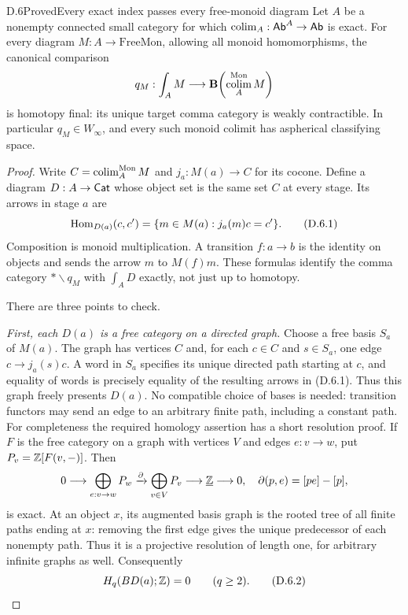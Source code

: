 \begin{claim}{D.6}{Proved}{Every exact index passes every free-monoid diagram}
\label{D:exact-monoids}
Let $A$ be a nonempty connected small category for which
$\operatorname*{colim}_A:\mathsf{Ab}^A\to\mathsf{Ab}$ is exact. For every diagram
$M:A\to\mathrm{FreeMon}$, allowing all monoid homomorphisms,
the canonical comparison
\[
 q_M:\int_A M\longrightarrow
 \mathbf B\!\left(\operatorname*{colim}_A^{\mathrm{Mon}}M\right)
\]
is homotopy final: its unique target comma category is weakly
contractible. In particular $q_M\in W_\infty$, and every such
monoid colimit has aspherical classifying space.
\end{claim}
\begin{proof}
Write $C=\operatorname*{colim}_A^{\mathrm{Mon}}M$ and
$j_a:M(a)\to C$ for its cocone. Define a diagram $D:A\to\mathsf{Cat}$
whose object set is the same set $C$ at every stage. Its arrows
in stage $a$ are
\[
 \operatorname{Hom}_{D(a)}(c,c')=
 \{m\in M(a):j_a(m)c=c'\}.
 \tag{D.6.1}
\]
Composition is monoid multiplication. A transition $f:a\to b$
is the identity on objects and sends the arrow $m$ to $M(f)m$.
These formulas identify the comma category
$*\backslash q_M$ with $\int_A D$ exactly, not just up to
homotopy.

There are three points to check.

\emph{First, each $D(a)$ is a free category on a directed graph.}
Choose a free basis $S_a$ of $M(a)$. The graph has vertices $C$
and, for each $c\in C$ and $s\in S_a$, one edge
$c\to j_a(s)c$. A word in $S_a$ specifies its unique directed
path starting at $c$, and equality of words is precisely equality
of the resulting arrows in (D.6.1). Thus this graph freely
presents $D(a)$. No compatible choice of bases is needed:
transition functors may send an edge to an arbitrary finite
path, including a constant path. For completeness the required homology assertion has a short
resolution proof. If $F$ is the free category on a graph with
vertices $V$ and edges $e:v\to w$, put
$P_v=\mathbb Z[F(v,-)]$. Then
\[
 0\longrightarrow\bigoplus_{e:v\to w}P_w
 \xrightarrow{\partial}\bigoplus_{v\in V}P_v
 \longrightarrow\underline{\mathbb Z}\longrightarrow0,
 \quad \partial(p,e)=[pe]-[p],
\]
is exact. At an object $x$, its augmented basis graph is the
rooted tree of all finite paths ending at $x$: removing the first
edge gives the unique predecessor of each nonempty path. Thus
it is a projective resolution of length one, for arbitrary
infinite graphs as well. Consequently
\[
 H_q(BD(a);\mathbb Z)=0\qquad(q\geq2).
 \tag{D.6.2}
\]


\end{proof}
